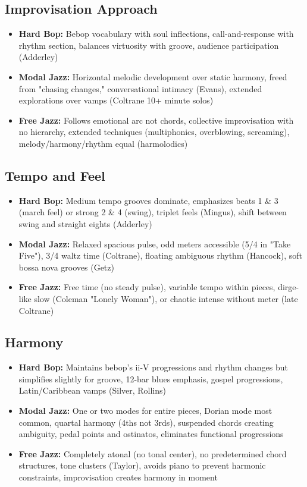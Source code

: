 \documentclass[11pt]{article}
\begin{document}
\subsection*{Improvisation Approach}
\begin{itemize}[leftmargin=*, itemsep=0.2em]
\item \textbf{Hard Bop:} Bebop vocabulary with soul inflections, call-and-response with rhythm section, balances virtuosity with groove, audience participation (Adderley)
\item \textbf{Modal Jazz:} Horizontal melodic development over static harmony, freed from "chasing changes," conversational intimacy (Evans), extended explorations over vamps (Coltrane 10+ minute solos)
\item \textbf{Free Jazz:} Follows emotional arc not chords, collective improvisation with no hierarchy, extended techniques (multiphonics, overblowing, screaming), melody/harmony/rhythm equal (harmolodics)
\end{itemize}

\subsection*{Tempo and Feel}
\begin{itemize}[leftmargin=*, itemsep=0.2em]
\item \textbf{Hard Bop:} Medium tempo grooves dominate, emphasizes beats 1 \& 3 (march feel) or strong 2 \& 4 (swing), triplet feels (Mingus), shift between swing and straight eights (Adderley)
\item \textbf{Modal Jazz:} Relaxed spacious pulse, odd meters accessible (5/4 in "Take Five"), 3/4 waltz time (Coltrane), floating ambiguous rhythm (Hancock), soft bossa nova grooves (Getz)
\item \textbf{Free Jazz:} Free time (no steady pulse), variable tempo within pieces, dirge-like slow (Coleman "Lonely Woman"), or chaotic intense without meter (late Coltrane)
\end{itemize}

\subsection*{Harmony}
\begin{itemize}[leftmargin=*, itemsep=0.2em]
\item \textbf{Hard Bop:} Maintains bebop's ii-V progressions and rhythm changes but simplifies slightly for groove, 12-bar blues emphasis, gospel progressions, Latin/Caribbean vamps (Silver, Rollins)
\item \textbf{Modal Jazz:} One or two modes for entire pieces, Dorian mode most common, quartal harmony (4ths not 3rds), suspended chords creating ambiguity, pedal points and ostinatos, eliminates functional progressions
\item \textbf{Free Jazz:} Completely atonal (no tonal center), no predetermined chord structures, tone clusters (Taylor), avoids piano to prevent harmonic constraints, improvisation creates harmony in moment
\end{itemize}
\end{document}
